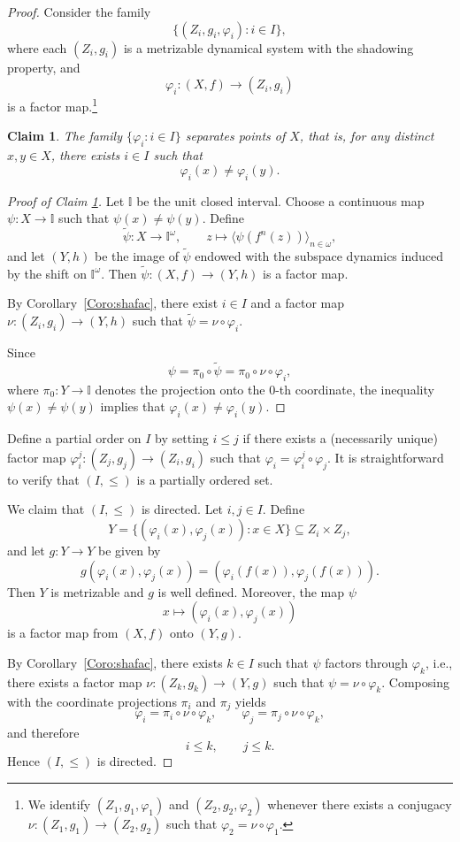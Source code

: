 \documentclass[10pt,a4paper]{amsart}
\numberwithin{equation}{section}
\newtheorem{claim}{Claim}
\def\I{{\mathbb{I}}}
\begin{document}
\begin{proof}
Consider the family
\[
\{(Z_i,g_i,\varphi_i):i\in I\},
\]
where each $(Z_i,g_i)$ is a metrizable dynamical system with the shadowing property, and
\[
\varphi_i:(X,f)\to (Z_i,g_i)
\]
is a factor map.\footnote{
We identify $(Z_1,g_1,\varphi_1)$ and $(Z_2,g_2,\varphi_2)$ whenever there exists a conjugacy
$
\nu:(Z_1,g_1)\to (Z_2,g_2)
$
such that
$
\varphi_2=\nu\circ \varphi_1.
$
}

\begin{claim}\label{c0}
The family $\{\varphi_i:i\in I\}$ separates points of $X$, that is, for any distinct $x,y\in X$, there exists $i\in I$ such that
\[
\varphi_i(x)\neq \varphi_i(y).
\]
\end{claim}

\begin{proof}[Proof of Claim \ref{c0}]
Let $\I$ be the unit closed interval.
Choose a continuous map
$
\psi:X\to \mathbb I
$
such that $\psi(x)\neq \psi(y)$. Define
\[
\widetilde{\psi}:X\to \mathbb I^\omega,
\qquad
z\mapsto \langle \psi(f^n(z))\rangle_{n\in\omega},
\]
and let $(Y,h)$ be the image of $\widetilde{\psi}$ endowed with the subspace dynamics induced by the shift on $\mathbb I^\omega$. Then $\widetilde{\psi}:(X,f)\to (Y,h)$ is a factor map.

By Corollary~\ref{Coro:shafac}, there exist $i\in I$ and a factor map
$
\nu:(Z_i,g_i)\to (Y,h)
$
such that
$
\widetilde{\psi}
=
\nu\circ \varphi_i.$

Since
\[
\psi
=
\pi_0\circ \widetilde{\psi}
=
\pi_0\circ \nu\circ \varphi_i,
\]
where $\pi_0:Y\to \mathbb I$ denotes the projection onto the $0$-th coordinate, the inequality $\psi(x)\neq \psi(y)$ implies that
$
\varphi_i(x)\neq \varphi_i(y).
$
\end{proof}
Define a partial order on $I$ by setting $i\le j$ if there exists a (necessarily unique) factor map
$
\varphi_i^j:(Z_j,g_j)\to (Z_i,g_i)
$
such that
$
\varphi_i=\varphi_i^j\circ \varphi_j.
$
It is straightforward to verify that $(I,\le)$ is a partially ordered set.

We claim that $(I,\le)$ is directed. 
Let $i,j\in I$. Define
\[
Y=\{(\varphi_i(x),\varphi_j(x)):x\in X\}\subseteq Z_i\times Z_j,
\]
and let
$
g:Y\to Y
$
be given by
\[
g(\varphi_i(x),\varphi_j(x))
=
(\varphi_i(f(x)),\varphi_j(f(x))).
\]
Then $Y$ is metrizable and $g$ is well defined. Moreover, the map $\psi$
\[
x\mapsto (\varphi_i(x),\varphi_j(x))
\]
is a factor map from $(X,f)$ onto $(Y,g)$.

By Corollary~\ref{Coro:shafac}, there exists $k\in I$ such that $\psi$ factors through $\varphi_k$, i.e., there exists a factor map
$
\nu:(Z_k,g_k)\to (Y,g)
$
such that
$
\psi=\nu\circ \varphi_k.
$
Composing with the coordinate projections $\pi_i$ and $\pi_j$ yields
\[
\varphi_i=\pi_i\circ \nu\circ \varphi_k,
\qquad
\varphi_j=\pi_j\circ \nu\circ \varphi_k,
\]
and therefore
\[
i\le k,
\qquad
j\le k.
\]
Hence $(I,\le)$ is directed.



\end{proof}
\end{document}

